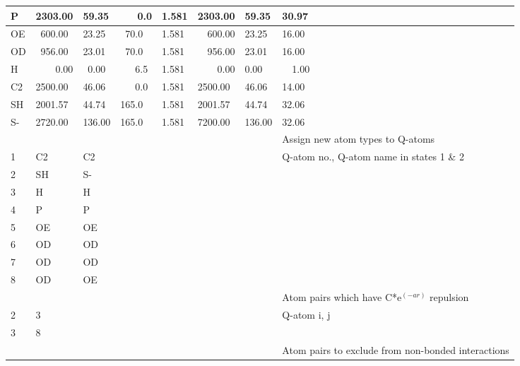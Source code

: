 \documentclass[a4paper,10pt]{article}
\begin{document}
\begin{longtable}{|p{35pt} p{35pt} p{35pt} p{35pt} p{35pt} p{35pt} p{35pt}| p{100pt}|}
  \hline P          & 2303.00 & 59.35  & ~~~0.0 & 1.581 & 2303.00 & \multicolumn{1}{l}{59.35}   & \multicolumn{1}{l|}{30.97} \\
  \hline OE         & ~600.00  & 23.25  & ~70.0 & 1.581 & \multicolumn{1}{r}{600.00}  & \multicolumn{1}{l}{23.25}   & \multicolumn{1}{l|}{16.00} \\
  \hline OD         & ~956.00  & 23.01  & ~70.0 & 1.581 & \multicolumn{1}{r}{956.00}  & \multicolumn{1}{l}{23.01}   & \multicolumn{1}{l|}{16.00} \\
  \hline H          & \multicolumn{1}{r}{0.00} & ~0.00  & ~~~6.5 & 1.581 & \multicolumn{1}{r}{0.00}  & \multicolumn{1}{l}{0.00}    & \multicolumn{1}{l|}{~~1.00} \\
  \hline C2         & 2500.00 & 46.06  & ~~~0.0 & 1.581 & 2500.00 & \multicolumn{1}{l}{46.06}   & \multicolumn{1}{l|}{14.00} \\
  \hline SH         & 2001.57 & 44.74  & 165.0 & 1.581 & 2001.57 & \multicolumn{1}{l}{44.74}   & \multicolumn{1}{l|}{32.06} \\
  \hline S-         & 2720.00 & 136.00 & 165.0 & 1.581 & 7200.00 & \multicolumn{1}{l}{136.00}  & \multicolumn{1}{l|}{32.06} \\
  \hline [change{\_}atoms] &      &  &  &  &  &  & Assign new atom types to Q-atoms \\
  \hline 1 & C2    & C2              &  &  &  &  & Q-atom no., Q-atom name in states 1 \& 2\\
  \hline 2 & SH    & S-              &  &  &  &  & \\
  \hline 3 & H     & H               &  &  &  &  & \\
  \hline 4 & P     & P               &  &  &  &  & \\
  \hline 5 & OE    & OE              &  &  &  &  & \\
  \hline 6 & OD    & OD              &  &  &  &  & \\
  \hline 7 & OD    & OD              &  &  &  &  & \\
  \hline 8 & OD    & OE              &  &  &  &  & \\
  \hline [soft{\_}pairs]   &      &  &  &  &  &  & Atom pairs which have C*e$^{(-ar)}$ repulsion \\
  \hline 2 & 3                    &  &  &  &  &  & Q-atom i, j \\
  \hline 3 & 8                    &  &  &  &  &  & \\
  \hline [excluded{\_}pairs] &    &  &  &  &  &  & Atom pairs to exclude from non-bonded interactions \\

\end{longtable}
\end{document}
